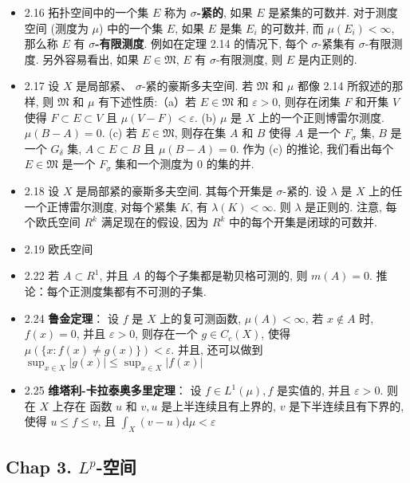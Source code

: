 \begin{itemize}
\item 2.16 拓扑空间中的一个集 $E$ 称为 \textbf{$\sigma$-紧的}, 如果 $E$ 是紧集的可数并. 对于测度空间 (测度为 $\mu$) 中的一个集 $E$, 如果 $E$ 是集 $E_{i}$ 的可数并, 而 $\mu\left(E_{i}\right)<\infty$, 那么称 $E$ 有 \textbf{$\sigma$-有限测度}. 例如在定理 2.14 的情况下, 每个 $\sigma$-紧集有 $\sigma$-有限测度. 另外容易看出, 如果 $E \in\mathfrak{M}$, $E$ 有 $\sigma$-有限测度, 则 $E$ 是内正则的.

\item 2.17 设 $X$ 是局部紧、 $\sigma$-紧的豪斯多夫空间. 若 $\mathfrak{M}$ 和 $\mu$ 都像 2.14 所叙述的那样, 则 $\mathfrak{M}$ 和 $\mu$ 有下述性质:（a）若 $E \in \mathfrak{M}$ 和 $\varepsilon>0$, 则存在闭集 $F$ 和开集 $V$ 使得 $F \subset E \subset V$ 且 $\mu(V-F)<\varepsilon$. (b) $\mu$ 是 $X$ 上的一个正则博雷尔测度. $\mu(B-A)=0$. (c) 若 $E \in \mathfrak{M}$, 则存在集 $A$ 和 $B$ 使得 $A$ 是一个 $F_{\sigma}$ 集, $B$ 是一个 $G_{\delta}$ 集, $A \subset E \subset B$ 且 $\mu(B-A)=0$. 作为 (c) 的推论, 我们看出每个 $E \in \mathfrak{M}$ 是一个 $F_\sigma$ 集和一个测度为 0 的集的并.

\item 2.18 设 $X$ 是局部紧的豪斯多夫空间. 其每个开集是 $\sigma$-紧的. 设 $\lambda$ 是 $X$ 上的任一个正博雷尔测度, 对每个紧集 $K$, 有 $\lambda(K)<\infty$. 则 $\lambda$ 是正则的. 注意, 每个欧氏空间 $R^{k}$ 满足现在的假设, 因为 $R^{k}$ 中的每个开集是闭球的可数并.

\item 2.19 欧氏空间

\item 2.22 若 $A \subset R^{1}$, 并且 $A$ 的每个子集都是勒贝格可测的, 则 $m(A)=0$. 推论：每个正测度集都有不可测的子集.

\item 2.24 \textbf{鲁金定理}： 设 $f$ 是 $X$ 上的复可测函数, $\mu(A)<\infty$, 若 $x \notin A$ 时, $f(x)=0$, 并且 $\varepsilon>0$, 则存在一个 $g \in C_{c}(X)$, 使得 $\mu(\{x: f(x) \neq g(x)\})<\varepsilon$. 并且, 还可以做到 $\sup _{x \in X}|g(x)| \leqslant \sup _{x \in X}|f(x)|$

\item 2.25 \textbf{维塔利-卡拉泰奥多里定理}： 设 $f \in L^{1}(\mu), f$ 是实值的, 并且 $\varepsilon>0$. 则在 $X$ 上存在 函数 $u$ 和 $v, u$ 是上半连续且有上界的, $v$ 是下半连续且有下界的, 使得 $u \leqslant f \leqslant v$, 且 $\int_{X}(v-u) \mathrm{d} \mu<\varepsilon$

\end{itemize}

\subsection{Chap 3. $L^p$-空间}

